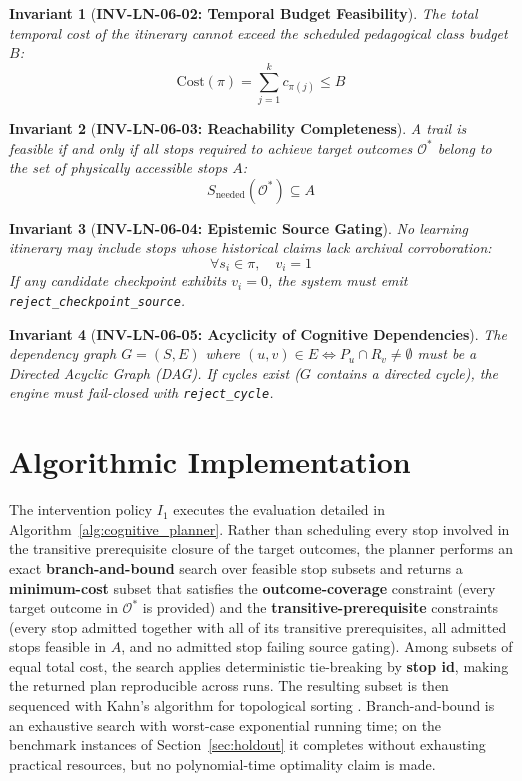 \documentclass[11pt,a4paper]{article}
\newtheorem{invariant}{Invariant}
\begin{document}
\begin{invariant}[\textbf{INV-LN-06-02: Temporal Budget Feasibility}]
The total temporal cost of the itinerary cannot exceed the scheduled pedagogical class budget $B$:
\begin{equation}
\text{Cost}(\pi) = \sum_{j=1}^{k} c_{\pi(j)} \le B
\end{equation}
\end{invariant}

\begin{invariant}[\textbf{INV-LN-06-03: Reachability Completeness}]
A trail is feasible if and only if all stops required to achieve target outcomes $\mathcal{O}^*$ belong to the set of physically accessible stops $A$:
\begin{equation}
S_{\text{needed}}(\mathcal{O}^*) \subseteq A
\end{equation}
\end{invariant}

\begin{invariant}[\textbf{INV-LN-06-04: Epistemic Source Gating}]
No learning itinerary may include stops whose historical claims lack archival corroboration:
\begin{equation}
\forall s_i \in \pi, \quad v_i = 1
\end{equation}
If any candidate checkpoint exhibits $v_i = 0$, the system must emit \texttt{reject\_checkpoint\_source}.
\end{invariant}

\begin{invariant}[\textbf{INV-LN-06-05: Acyclicity of Cognitive Dependencies}]
The dependency graph $G = (S, E)$ where $(u, v) \in E \iff P_u \cap R_v \ne \emptyset$ must be a Directed Acyclic Graph (DAG). If cycles exist ($G$ contains a directed cycle), the engine must fail-closed with \texttt{reject\_cycle}.
\end{invariant}

\section{Algorithmic Implementation}
The intervention policy $I_1$ executes the evaluation detailed in Algorithm~\ref{alg:cognitive_planner}. Rather than scheduling every stop involved in the transitive prerequisite closure of the target outcomes, the planner performs an exact \textbf{branch-and-bound} search over feasible stop subsets and returns a \textbf{minimum-cost} subset that satisfies the \textbf{outcome-coverage} constraint (every target outcome in $\mathcal{O}^*$ is provided) and the \textbf{transitive-prerequisite} constraints (every stop admitted together with all of its transitive prerequisites, all admitted stops feasible in $A$, and no admitted stop failing source gating). Among subsets of equal total cost, the search applies deterministic tie-breaking by \textbf{stop id}, making the returned plan reproducible across runs. The resulting subset is then sequenced with Kahn's algorithm for topological sorting \cite{kahn1962topological}. Branch-and-bound is an exhaustive search with worst-case exponential running time; on the benchmark instances of Section~\ref{sec:holdout} it completes without exhausting practical resources, but no polynomial-time optimality claim is made.
\end{document}
